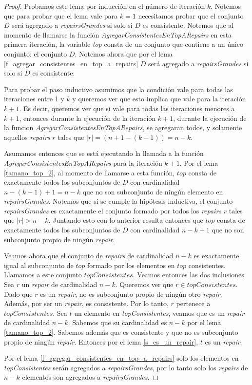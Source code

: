 \documentclass[11pt,a4paper,twoside]{tesis}
\begin{document}
\begin{proof}
Probamos este lema por inducción en el número de iteración $k$. Notemos que para probar que el lema vale para $k = 1$ necesitamos probar que el conjunto $D$ será agregado a \textit{repairsGrandes} si solo si $D$ es consistente. Notemos que al momento de llamarse la función \textit{AgregarConsistentesEnTopARepairs} en esta primera iteración, la variable \textit{top} consta de un conjunto que contiene a un único conjunto: el conjunto $D$. Notemos ahora que por el lema \ref{f_agregar_consistentes_en_top_a_repairs} $D$ será agregado a \textit{repairsGrandes} si solo si $D$ es consistente.

Para probar el paso inductivo asumimos que la condición vale para todas las iteraciones entre 1 y $k$ y queremos ver que esto implica que vale para la iteración $k+1$. Es decir, queremos ver que si vale para todas las iteraciones menores a $k+1$, entonces durante la ejecución de la iteración $k+1$, durante la ejecución de la funcion \textit{AgregarConsistentesEnTopARepairs}, se agregaran todos, y solamente aquellos \textit{repairs} $r$ tales que $|r| = (n + 1 - (k+1)) = n - k$.


Asumamos entonces que se está ejecutando la llamada a la función \textit{AgregarConsistentesEnTopARepairs} para la iteración $k+1$. Por el lema \ref{tamano_top_2}, al momento de llamarse a esta función, $top$ consta de exactamente todos los subconjuntos de $D$ con cardinalidad $n - (k + 1) + 1 = n - k$ que no son subconjunto de ningún elemento en \textit{repairsGrandes}. Notemos que si se cumple la hipótesis inductiva, el conjunto \textit{repairsGrandes} es exactamente el conjunto formado por todos los \textit{repairs} $r$ tales que $|r| > n - k$. Juntando esto con lo anterior resulta entonces que $top$ consta de exactamente todos los subconjuntos de $D$ con cardinalidad $n - k + 1$ que no son subconjunto propio de ningún \textit{repair}. 

Veamos ahora que el conjunto de \textit{repairs} de cardinalidad $n-k$ es exactamente igual al subconjunto de $top$ formado por los elementos en $top$ consistentes. Llamamos a este conjunto $topConsistentes$. Veamos entonces las dos inclusiones.
Sea $r$ un \textit{repair} de cardinalidad $n-k$. Queremos ver que $r \in topConsistentes$. Dado que $r$ es un \textit{repair}, no es subconjunto propio de ningún otro \textit{repair}. Además, por ser un \textit{repair}, es consistente. Por lo tanto, $r$ pertenece a $topConsistentes$.
Sea $t$ un elemento en \textit{topConsistentes}, veamos que es un \textit{repair} de cardinalidad $n-k$. Sabemos que su cardinalidad es $n-k$ por el lema \ref{tamano_top_2}. Sabemos además que es consistente y que no es subconjunto propio de ningún \textit{repair}. Entonces por el lema \ref{s_es_un_repair}, $t$ es un \textit{repair}.

Por el lema \ref{f_agregar_consistentes_en_top_a_repairs} solo los elementos en \textit{topConsistentes} serán agregados a \textit{repairsGrandes}, por lo tanto solo los \textit{repairs} de $n-k$ elementos son agregados a \textit{repairsGrandes}.
\end{proof}
\end{document}
